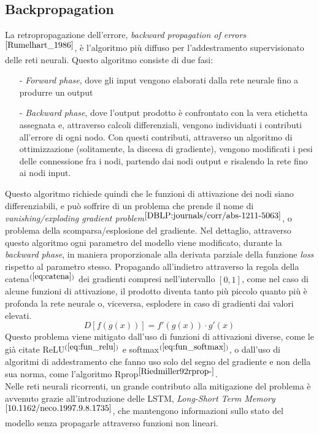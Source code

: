 \subsection*{Backpropagation} La retropropagazione dell'errore, \textit{backward propagation of errors}$^{\cite{Rumelhart_1986}}$, è l'algoritmo più diffuso per l'addestramento supervisionato delle reti neurali. Questo algoritmo consiste di due fasi:
\begin{itemize}
    \item[-] \textit{Forward phase}, dove gli input vengono elaborati dalla rete neurale fino a produrre un output
    \item[-] \textit{Backward phase}, dove l'output prodotto è confrontato con la vera etichetta assegnata e, attraverso calcoli differenziali, vengono individuati i contributi all'errore di ogni nodo. Con questi contributi, attraverso un algoritmo di ottimizzazione (solitamente, la discesa di gradiente), vengono modificati i pesi delle connessione fra i nodi, partendo dai nodi output e risalendo la rete fino ai nodi input.
\end{itemize}
Questo algoritmo richiede quindi che le funzioni di attivazione dei nodi siano differenziabili, e può soffrire di un problema che prende il nome di \textit{vanishing/exploding gradient problem}$^{\cite{DBLP:journals/corr/abs-1211-5063}}$, o problema della scomparsa/esplosione del gradiente. Nel dettaglio, attraverso questo algoritmo ogni parametro del modello viene modificato, durante la \textit{backward phase}, in maniera proporzionale alla derivata parziale della funzione \textit{loss} rispetto al parametro stesso. Propagando all'indietro attraverso la regola della catena$^{(\ref{eq:catena})}$ dei gradienti compresi nell'intervallo $[0, 1]$, come nel caso di alcune funzioni di attivazione, il prodotto diventa tanto più piccolo quanto più è profonda la rete neurale o, viceversa, esplodere in caso di gradienti dai valori elevati.
\begin{equation}\label{eq:catena}
D\left[f(g(x))\right] = f'(g(x))\cdot g'(x)
\end{equation}
Questo problema viene mitigato dall'uso di funzioni di attivazioni diverse, come le già citate ReLU$^{(\ref{eq:fun_relu})}$ e softmax$^{(\ref{eq:fun_softmax})}$, o dall'uso di algoritmi di addestramento che fanno uso solo del segno del gradiente e non della sua norma, come l'algoritmo Rprop$^{\cite{Riedmiller92rprop-}}$.\\
Nelle reti neurali ricorrenti, un grande contributo alla mitigazione del problema è avvenuto grazie all'introduzione delle LSTM, \textit{Long-Short Term Memory}$^{\cite{10.1162/neco.1997.9.8.1735}}$, che mantengono informazioni sullo stato del modello senza propagarle attraverso funzioni non lineari.

